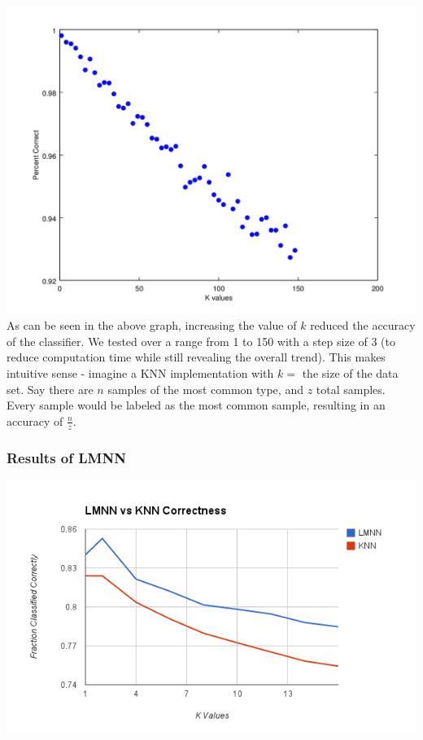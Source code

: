 \documentclass[11pt]{article}
\begin{document}
    \paragraph{}
    \includegraphics[scale=.66]{kValuesGraph.png}
    \\
    As can be seen in the above graph, increasing the value of $k$ reduced the accuracy of the classifier. We tested over a range from 1 to 150 with a step size of 3 (to reduce computation time while still revealing the overall trend). This makes intuitive sense - imagine a KNN implementation with $k = $ the size of the data set. Say there are $n$ samples of the most common type, and $z$ total samples. Every sample would be labeled as the most common sample, resulting in an accuracy of $\frac{n}{z}$.
    \subsubsection*{Results of LMNN}
    \includegraphics[scale=.66]{knnvslmnn.png}
\end{document}

